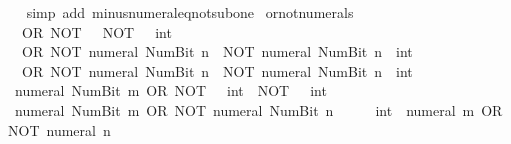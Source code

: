 \begin{isabellebody}
%
\isadelimproof
\ \ %
\endisadelimproof
%
\isatagproof
{}\isamarkupfalse%
\ {\isacharparenleft}{\kern0pt}simp\ add{\isacharcolon}{\kern0pt}\ minus{\isacharunderscore}{\kern0pt}numeral{\isacharunderscore}{\kern0pt}eq{\isacharunderscore}{\kern0pt}not{\isacharunderscore}{\kern0pt}sub{\isacharunderscore}{\kern0pt}one{\isacharparenright}{\kern0pt}%
\endisatagproof
{\isafoldproof}%
%
\isadelimproof
\isanewline
%
\endisadelimproof
\isanewline
{}\isamarkupfalse%
\ or{\isacharunderscore}{\kern0pt}not{\isacharunderscore}{\kern0pt}numerals{\isacharcolon}{\kern0pt}\isanewline
\ \ {\isacartoucheopen}{}\ OR\ NOT\ {}\ {\isacharequal}{\kern0pt}\ NOT\ {\isacharparenleft}{\kern0pt}{}\ {\isacharcolon}{\kern0pt}{\isacharcolon}{\kern0pt}\ int{\isacharparenright}{\kern0pt}{\isacartoucheclose}\isanewline
\ \ {\isacartoucheopen}{}\ OR\ NOT\ {\isacharparenleft}{\kern0pt}numeral\ {\isacharparenleft}{\kern0pt}Num{\isachardot}{\kern0pt}Bit{}\ n{\isacharparenright}{\kern0pt}{\isacharparenright}{\kern0pt}\ {\isacharequal}{\kern0pt}\ NOT\ {\isacharparenleft}{\kern0pt}numeral\ {\isacharparenleft}{\kern0pt}Num{\isachardot}{\kern0pt}Bit{}\ n{\isacharparenright}{\kern0pt}\ {\isacharcolon}{\kern0pt}{\isacharcolon}{\kern0pt}\ int{\isacharparenright}{\kern0pt}{\isacartoucheclose}\isanewline
\ \ {\isacartoucheopen}{}\ OR\ NOT\ {\isacharparenleft}{\kern0pt}numeral\ {\isacharparenleft}{\kern0pt}Num{\isachardot}{\kern0pt}Bit{}\ n{\isacharparenright}{\kern0pt}{\isacharparenright}{\kern0pt}\ {\isacharequal}{\kern0pt}\ NOT\ {\isacharparenleft}{\kern0pt}numeral\ {\isacharparenleft}{\kern0pt}Num{\isachardot}{\kern0pt}Bit{}\ n{\isacharparenright}{\kern0pt}\ {\isacharcolon}{\kern0pt}{\isacharcolon}{\kern0pt}\ int{\isacharparenright}{\kern0pt}{\isacartoucheclose}\isanewline
\ \ {\isacartoucheopen}numeral\ {\isacharparenleft}{\kern0pt}Num{\isachardot}{\kern0pt}Bit{}\ m{\isacharparenright}{\kern0pt}\ OR\ NOT\ {\isacharparenleft}{\kern0pt}{}\ {\isacharcolon}{\kern0pt}{\isacharcolon}{\kern0pt}\ int{\isacharparenright}{\kern0pt}\ {\isacharequal}{\kern0pt}\ NOT\ {\isacharparenleft}{\kern0pt}{}\ {\isacharcolon}{\kern0pt}{\isacharcolon}{\kern0pt}\ int{\isacharparenright}{\kern0pt}{\isacartoucheclose}\isanewline
\ \ {\isacartoucheopen}numeral\ {\isacharparenleft}{\kern0pt}Num{\isachardot}{\kern0pt}Bit{}\ m{\isacharparenright}{\kern0pt}\ OR\ NOT\ {\isacharparenleft}{\kern0pt}numeral\ {\isacharparenleft}{\kern0pt}Num{\isachardot}{\kern0pt}Bit{}\ n{\isacharparenright}{\kern0pt}{\isacharparenright}{\kern0pt}\ {\isacharequal}{\kern0pt}\ {}\ {\isacharplus}{\kern0pt}\ {\isacharparenleft}{\kern0pt}{}\ {\isacharcolon}{\kern0pt}{\isacharcolon}{\kern0pt}\ int{\isacharparenright}{\kern0pt}\ {\isacharasterisk}{\kern0pt}\ {\isacharparenleft}{\kern0pt}numeral\ m\ OR\ NOT\ {\isacharparenleft}{\kern0pt}numeral\ n{\isacharparenright}{\kern0pt}{\isacharparenright}{\kern0pt}{\isacartoucheclose}\isanewline

\end{isabellebody}
